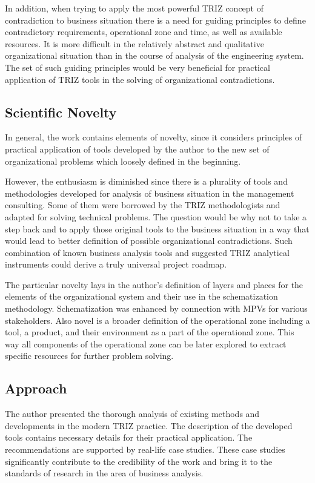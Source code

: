 \documentclass[11pt,a4paper]{article}
\begin{document}
In addition, when trying to apply the most powerful TRIZ concept of
contradiction to business situation there is a need for guiding principles to
define contradictory requirements, operational zone and time, as well as
available resources. It is more difficult in the relatively abstract and
qualitative organizational situation than in the course of analysis of the
engineering system. The set of such guiding principles would be very
beneficial for practical application of TRIZ tools in the solving of
organizational contradictions.

\subsection*{Scientific Novelty}
In general, the work contains elements of novelty, since it considers
principles of practical application of tools developed by the author to the
new set of organizational problems which loosely defined in the beginning.

However, the enthusiasm is diminished since there is a plurality of tools and
methodologies developed for analysis of business situation in the management
consulting. Some of them were borrowed by the TRIZ methodologists and adapted
for solving technical problems. The question would be why not to take a step
back and to apply those original tools to the business situation in a way that
would lead to better definition of possible organizational contradictions.
Such combination of known business analysis tools and suggested TRIZ
analytical instruments could derive a truly universal project roadmap.

The particular novelty lays in the author’s definition of layers and places
for the elements of the organizational system and their use in the
schematization methodology.  Schematization was enhanced by connection with
MPVs for various stakeholders. Also novel is a broader definition of the
operational zone including a tool, a product, and their environment as a part
of the operational zone. This way all components of the operational zone can
be later explored to extract specific resources for further problem solving.

\subsection*{Approach}
The author presented the thorough analysis of existing methods and
developments in the modern TRIZ practice. The description of the developed
tools contains necessary details for their practical application. The
recommendations are supported by real-life case studies. These case studies
significantly contribute to the credibility of the work and bring it to the
standards of research in the area of business analysis.
\end{document}
